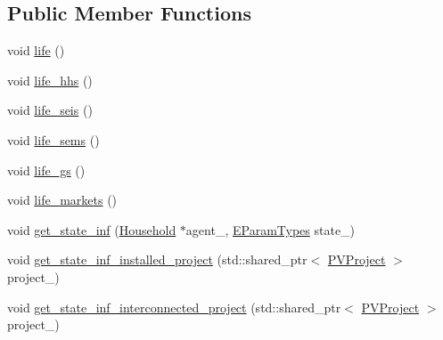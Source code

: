 \subsection*{Public Member Functions}
{\bf }\par
\begin{DoxyCompactItemize}
\item 
void \hyperlink{classsolar__core_1_1_w_a5e64e5a7ef41c07fddf7994cd3f2693e}{life} ()
\item 
void \hyperlink{classsolar__core_1_1_w_a08283dbea7c7f3fe8b7f094a96f73a78}{life\+\_\+hhs} ()
\item 
void \hyperlink{classsolar__core_1_1_w_a77b206056c9440059f7b78e1424b0921}{life\+\_\+seis} ()
\item 
void \hyperlink{classsolar__core_1_1_w_a655c14c2a3d10952ab1217eedd21443f}{life\+\_\+sems} ()
\item 
void \hyperlink{classsolar__core_1_1_w_ad08af315706bb42ab5dd68f41a90c978}{life\+\_\+gs} ()
\item 
void \hyperlink{classsolar__core_1_1_w_a03a16fe70a11b947735709cf0a0b277e}{life\+\_\+markets} ()
\end{DoxyCompactItemize}

{\bf }\par
\begin{DoxyCompactItemize}
\item 
void \hyperlink{classsolar__core_1_1_w_a7fd073f0ebbf06378919f677bc28c2d1}{get\+\_\+state\+\_\+inf} (\hyperlink{classsolar__core_1_1_household}{Household} $\ast$agent\+\_\+, \hyperlink{namespacesolar__core_aa1147341e5ef7a40d68d1bd68e149362}{E\+Param\+Types} state\+\_\+)
\item 
void \hyperlink{classsolar__core_1_1_w_a1d99a46827c504a542ecda81b201a8f5}{get\+\_\+state\+\_\+inf\+\_\+installed\+\_\+project} (std\+::shared\+\_\+ptr$<$ \hyperlink{classsolar__core_1_1_p_v_project}{P\+V\+Project} $>$ project\+\_\+)
\item 
void \hyperlink{classsolar__core_1_1_w_a04252bc7247e71aa41798e98e42b6c15}{get\+\_\+state\+\_\+inf\+\_\+interconnected\+\_\+project} (std\+::shared\+\_\+ptr$<$ \hyperlink{classsolar__core_1_1_p_v_project}{P\+V\+Project} $>$ project\+\_\+)
\end{DoxyCompactItemize}

